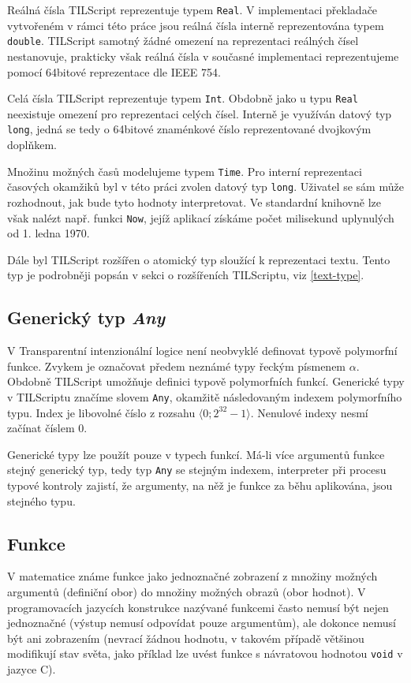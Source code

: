 Reálná čísla TILScript reprezentuje typem \lstinline{Real}. V implementaci překladače vytvořeném
v rámci této práce jsou reálná čísla interně reprezentována typem \lstinline{double}. TILScript
samotný žádné omezení na reprezentaci reálných čísel nestanovuje, prakticky však reálná čísla
v současné implementaci reprezentujeme pomocí 64bitové reprezentace dle IEEE 754.

Celá čísla TILScript reprezentuje typem \lstinline{Int}. Obdobně jako u typu \lstinline{Real}
neexistuje omezení pro reprezentaci celých čísel. Interně je využíván datový typ \lstinline{long},
jedná se tedy o 64bitové znaménkové číslo reprezentované dvojkovým doplňkem.

Množinu možných časů modelujeme typem \lstinline{Time}. Pro interní reprezentaci časových okamžiků
byl v této práci zvolen datový typ \lstinline{long}. Uživatel se sám může rozhodnout, jak bude tyto
hodnoty interpretovat. Ve standardní knihovně lze však nalézt např. funkci \lstinline{Now}, jejíž
aplikací získáme počet milisekund uplynulých od 1. ledna 1970.

Dále byl TILScript rozšířen o atomický typ sloužící k reprezentaci textu. Tento typ je podrobněji
popsán v sekci o rozšířeních TILScriptu, viz \ref{text-type}.

\subsection{Generický typ \textit{Any}}

V Transparentní intenzionální logice není neobvyklé definovat typově polymorfní funkce. Zvykem je
označovat předem neznámé typy řeckým písmenem $\alpha$. Obdobně TILScript umožňuje definici
typově polymorfních funkcí. Generické typy v TILScriptu značíme slovem \lstinline{Any}, okamžitě
následovaným indexem polymorfního typu. Index je libovolné číslo z rozsahu
$\bigl \langle 0; 2^{32}-1 \bigr \rangle$. Nenulové indexy nesmí začínat číslem 0.

Generické typy lze použít pouze v typech funkcí. Má-li více argumentů funkce stejný generický
typ, tedy typ \lstinline{Any} se stejným indexem, interpreter při procesu typové kontroly zajistí,
že argumenty, na něž je funkce za běhu aplikována, jsou stejného typu.

\subsection{Funkce}

V matematice známe funkce jako jednoznačné zobrazení z množiny možných argumentů (definiční obor)
do množiny možných obrazů (obor hodnot). V programovacích jazycích konstrukce nazývané funkcemi
často nemusí být nejen jednoznačné (výstup nemusí odpovídat pouze argumentům), ale dokonce nemusí
být ani zobrazením (nevrací žádnou hodnotu, v takovém případě většinou modifikují stav světa,
jako příklad lze uvést funkce s návratovou hodnotou \lstinline{void} v jazyce C).

